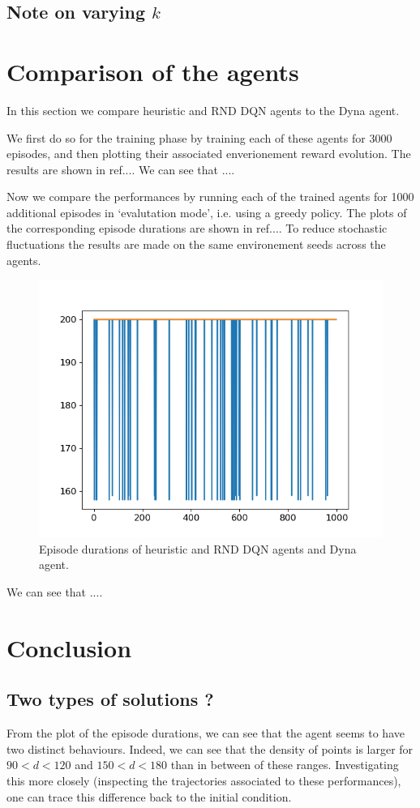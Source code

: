 \documentclass[a4paper, 12pt,oneside]{article}
\begin{document}
        \subsection{Note on varying $k$}

        
        \section{Comparison of the agents}
        In this section we compare heuristic and RND DQN agents to the Dyna agent. 
        
        We first do so for the training phase by training each of these agents for 3000 episodes, and then plotting their associated enverionement reward evolution. The results are shown in ref{...}.
        We can see that ....

        Now we compare the performances by running each of the trained agents for 1000 additional episodes in `evalutation mode', i.e. using a greedy policy. The plots of the corresponding episode durations are shown in ref{...}. To reduce stochastic fluctuations the results are made on the same environement seeds across the agents.
        \begin{figure}[h!]
            \centering
            \vspace{0em}
            \includegraphics[width=.75\textwidth]{../code/comparison}
            \caption{Episode durations of heuristic and RND DQN agents and Dyna agent.}
            \label{fig:agent-performance-comparison}
        \end{figure}
        We can see that ....
        \section{Conclusion}
        \subsection{Two types of solutions ?}
        From the plot of the episode durations, we can see that the agent seems to have two distinct behaviours. Indeed, we can see that the density of points is larger for $90<d<120$ and $150<d<180$ than in between of these ranges. Investigating this more closely (inspecting the trajectories associated to these performances), one can trace this difference back to the initial condition. 
        
\end{document}
